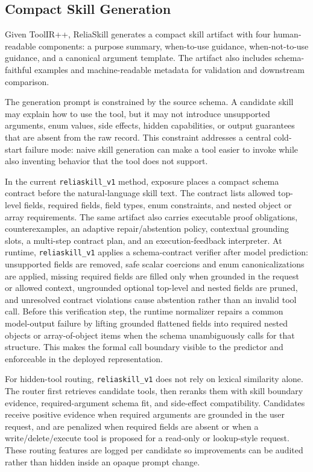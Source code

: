 \documentclass[11pt]{article}
\newcommand{\method}{ReliaSkill}
\begin{document}
\subsection{Compact Skill Generation}

Given ToolIR++, \method{} generates a compact skill artifact with four human-readable components: a purpose summary, when-to-use guidance, when-not-to-use guidance, and a canonical argument template. The artifact also includes schema-faithful examples and machine-readable metadata for validation and downstream comparison.

The generation prompt is constrained by the source schema. A candidate skill may explain how to use the tool, but it may not introduce unsupported arguments, enum values, side effects, hidden capabilities, or output guarantees that are absent from the raw record. This constraint addresses a central cold-start failure mode: naive skill generation can make a tool easier to invoke while also inventing behavior that the tool does not support.

In the current \texttt{reliaskill\_v1} method, exposure places a compact schema contract before the natural-language skill text. The contract lists allowed top-level fields, required fields, field types, enum constraints, and nested object or array requirements. The same artifact also carries executable proof obligations, counterexamples, an adaptive repair/abstention policy, contextual grounding slots, a multi-step contract plan, and an execution-feedback interpreter. At runtime, \texttt{reliaskill\_v1} applies a schema-contract verifier after model prediction: unsupported fields are removed, safe scalar coercions and enum canonicalizations are applied, missing required fields are filled only when grounded in the request or allowed context, ungrounded optional top-level and nested fields are pruned, and unresolved contract violations cause abstention rather than an invalid tool call. Before this verification step, the runtime normalizer repairs a common model-output failure by lifting grounded flattened fields into required nested objects or array-of-object items when the schema unambiguously calls for that structure. This makes the formal call boundary visible to the predictor and enforceable in the deployed representation.

For hidden-tool routing, \texttt{reliaskill\_v1} does not rely on lexical similarity alone. The router first retrieves candidate tools, then reranks them with skill boundary evidence, required-argument schema fit, and side-effect compatibility. Candidates receive positive evidence when required arguments are grounded in the user request, and are penalized when required fields are absent or when a write/delete/execute tool is proposed for a read-only or lookup-style request. These routing features are logged per candidate so improvements can be audited rather than hidden inside an opaque prompt change.
\end{document}
